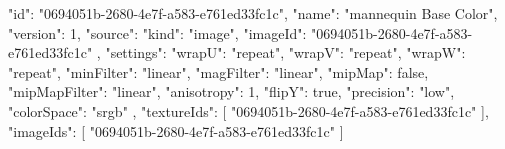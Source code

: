 {
  "id": "0694051b-2680-4e7f-a583-e761ed33fc1c",
  "name": "mannequin Base Color",
  "version": 1,
  "source": {
    "kind": "image",
    "imageId": "0694051b-2680-4e7f-a583-e761ed33fc1c"
  },
  "settings": {
    "wrapU": "repeat",
    "wrapV": "repeat",
    "wrapW": "repeat",
    "minFilter": "linear",
    "magFilter": "linear",
    "mipMap": false,
    "mipMapFilter": "linear",
    "anisotropy": 1,
    "flipY": true,
    "precision": "low",
    "colorSpace": "srgb"
  },
  "textureIds": [
    "0694051b-2680-4e7f-a583-e761ed33fc1c"
  ],
  "imageIds": [
    "0694051b-2680-4e7f-a583-e761ed33fc1c"
  ]
}
